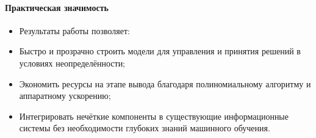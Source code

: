 \paragraph{Практическая значимость}
\begin{itemize}
  \item[] Результаты работы позволяет:
  \item Быстро и прозрачно строить модели для управления и принятия решений в условиях неопределённости;
  \item Экономить ресурсы на этапе вывода благодаря полиномиальному алгоритму и аппаратному ускорению;
  \item Интегрировать нечёткие компоненты в существующие информационные системы без необходимости глубоких знаний машинного обучения.
\end{itemize}

